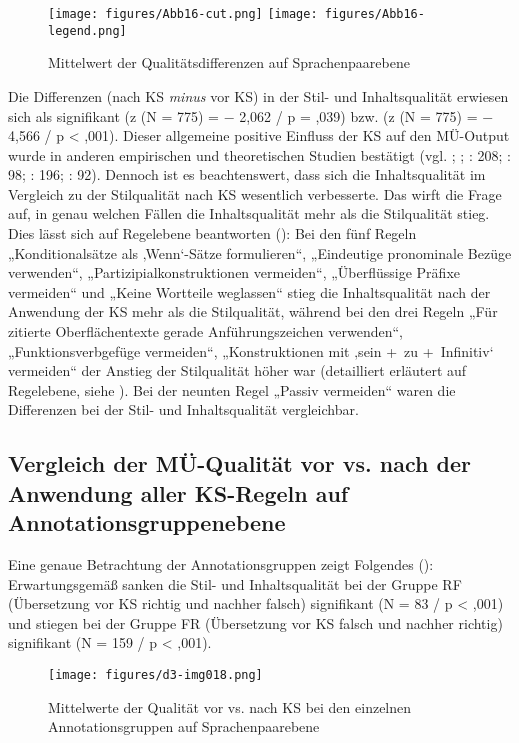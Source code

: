 \begin{figure}
\texttt{[image: figures/Abb16-cut.png]}
\texttt{[image: figures/Abb16-legend.png]}
\caption{\label{fig:05:16} Mittelwert der Qualitätsdifferenzen auf Sprachenpaarebene}
\end{figure}

Die Differenzen (nach KS \textit{minus} vor KS) in der Stil- und Inhaltsqualität erwiesen sich als signifikant (z (N = 775) = $-$ 2,062 / p = ,039) bzw. (z (N = 775) = $-$ 4,566 / p < ,001). Dieser allgemeine positive Einfluss der KS auf den MÜ-Output wurde in anderen empirischen und theoretischen Studien bestätigt (vgl. \citealt{NybergMitamura1996}; \citealt{Bernth1999}; \citealt{BernthGdaniec2001}: 208; \citealt{Drugan2013}: 98; \citealt{DrewerZiegler2014}: 196; \citealt{Wittkowsky2017}: 92). Dennoch ist es beachtenswert, dass sich die Inhaltsqualität im Vergleich zu der Stilqualität nach KS wesentlich verbesserte. Das wirft die Frage auf, in genau welchen Fällen die Inhaltsqualität mehr als die Stilqualität stieg. Dies lässt sich auf Regelebene beantworten (): Bei den fünf Regeln „Konditionalsätze als ‚Wenn‘-Sätze formulieren“, „Eindeutige pronominale Bezüge verwenden“, „Partizipialkonstruktionen vermeiden“, „Überflüssige Präfixe vermeiden“ und „Keine Wortteile weglassen“ stieg die Inhaltsqualität nach der Anwendung der KS mehr als die Stilqualität, während bei den drei Regeln „Für zitierte Oberflächentexte gerade Anführungszeichen verwenden“, „Funktionsverbgefüge vermeiden“, „Konstruktionen mit ‚sein +~zu +~Infinitiv‘ vermeiden“ der Anstieg der Stilqualität höher war (detailliert erläutert auf Regelebene, siehe ). Bei der neunten Regel „Passiv vermeiden“ waren die Differenzen bei der Stil- und Inhaltsqualität vergleichbar.

\subsection{Vergleich der MÜ-Qualität vor vs. nach der Anwendung aller KS-Regeln auf Annotationsgruppenebene}
\label{sec:5.2.6}
Eine genaue Betrachtung der Annotationsgruppen zeigt Folgendes (): Erwartungsgemäß sanken die Stil- und Inhaltsqualität bei der Gruppe RF (Übersetzung vor KS richtig und nachher falsch) signifikant (N = 83 / p < ,001) und stiegen bei der Gruppe FR (Übersetzung vor KS falsch und nachher richtig) signifikant (N = 159 / p < ,001).


\begin{figure}
\texttt{[image: figures/d3-img018.png]}


\caption{\label{fig:05:17}Mittelwerte der Qualität vor vs. nach KS bei den einzelnen Annotationsgruppen auf Sprachenpaarebene}
\end{figure}

